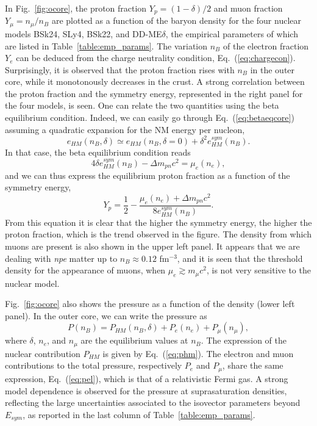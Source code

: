 In Fig.~\ref{fig:ocore}, the proton fraction $Y_p=(1-\delta)/2$ and muon 
fraction $Y_\mu = n_\mu/n_B$ are plotted as a function of the baryon density 
for the four nuclear models BSk24, SLy4, BSk22, and DD-ME$\delta$, the
empirical parameters of which are listed in Table~\ref{table:emp_params}. The
variation $n_B$ of the electron fraction $Y_e$ can be deduced from the
charge neutrality condition, Eq.~(\ref{eq:chargecon}). Surprisingly, it is
observed that the proton fraction rises with $n_B$ in the outer core, while 
it monotonously decreases in the crust. 
A strong correlation between the proton fraction and the symmetry energy,
represented in the right panel for the four models, is seen. One can relate the 
two quantities using the beta equilibrium condition. Indeed, we can easily go 
through Eq.~(\ref{eq:betaeqcore}) assuming a quadratic expansion for the NM 
energy per nucleon,
%
\begin{equation}
  e_{HM}(n_B,\delta) \simeq e_{HM}(n_B,\delta=0) + \delta^2 e_{HM}^{sym}(n_B).
\end{equation}
%
In that case, the beta equilibrium condition reads
%
\begin{equation}
  4\delta e_{HM}^{sym}(n_B) - \Delta m_{pn}c^2 = \mu_e(n_e),
\end{equation}
%
and we can thus express the equilibrium proton fraction as a function of 
the symmetry energy,
%
\begin{equation}
  Y_p = \frac{1}{2} - \frac{\mu_e(n_e) 
  + \Delta m_{pn}c^2}{8e_{HM}^{sym}(n_B)}.
\end{equation}
%
From this equation it is clear that the higher the symmetry energy, the higher
the proton fraction, which is the trend observed in the figure. 
The density from which muons are present is also shown in the upper left
panel. It appears that we are dealing with \textit{npe} matter up to 
$n_B \approx 0.12$ fm$^{-3}$, and it is seen that the threshold density for the
appearance of muons, when $\mu_e \gtrsim m_\mu c^2$, is not very sensitive to 
the nuclear model.

Fig.~\ref{fig:ocore} also shows the pressure as a function of the density
(lower left panel). In the outer core, we can write the pressure as
%
\begin{equation}
  P(n_B) = P_{HM}(n_B, \delta) + P_e(n_e) + P_\mu(n_\mu),
\end{equation}
%
where $\delta$, $n_e$, and $n_\mu$ are the equilibrium values at $n_B$. The
expression of the nuclear contribution $P_{HM}$ is given by
Eq.~(\ref{eq:phm}). The electron and muon contributions to the total pressure, 
respectively $P_e$ and $P_\mu$, share the same expression, Eq.~(\ref{eq:pel}), 
which is that of a relativistic Fermi gas. A strong model dependence is
observed for the pressure at suprasaturation densities, reflecting the large
uncertainties associated to the isovector parameters beyond $E_{sym}$, as
reported in the last column of Table~\ref{table:emp_params}.

